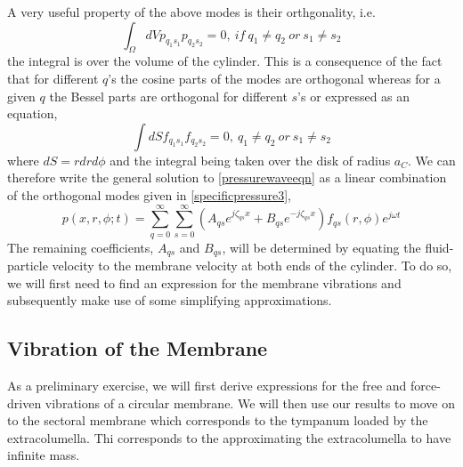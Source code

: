 A very useful property of the above modes is their orthgonality, i.e.
\begin{equation}\label{pressureorthogonality}
 \int_\Omega dVp_{q_1s_1}p_{q_2s_2}=0,\ if\ q_1\neq q_2\ or\ s_1\neq s_2
\end{equation}
the integral is over the volume of the cylinder. This is a consequence of the fact that for different $q$'s
the cosine parts of the modes are orthogonal whereas for a given $q$ the Bessel parts are orthogonal for
different $s$'s or expressed as an equation,
\begin{equation}\label{besselorthogonality}
 \int dS f_{q_1s_1}f_{q_2s_2}=0,\ q_1\neq q_2\ or\ s_1\neq s_2
\end{equation}
where $dS=rdrd\phi$ and the integral being taken over the disk of radius $a_C$.
We can therefore write the general solution to \eqref{pressurewaveeqn} as a linear combination of the orthogonal modes given in \eqref{specificpressure3},
\begin{equation}\label{pressuregeneral1}
 p(x,r,\phi;t)=\displaystyle\sum^\infty_{q=0}\displaystyle\sum^\infty_{s=0}\left(A_{qs}e^{j\zeta_{qs}x}+B_{qs}e^{-j\zeta_{qs}x}\right)f_{qs}(r,\phi)e^{j\omega t}
\end{equation}
The remaining coefficients, $A_{qs}$ and $B_{qs}$, will be determined by equating the fluid-particle velocity to
the membrane velocity at both ends of the cylinder. To do so, we will first need to find an expression
for the membrane vibrations and subsequently make use of some simplifying approximations.

\subsection{Vibration of the Membrane}
As a preliminary exercise, we will first derive expressions for the free and force-driven
vibrations of a circular membrane. We will then use our results to move on to the sectoral membrane 
which corresponds to the tympanum loaded by the extracolumella. Thi corresponds to the approximating
the extracolumella to have infinite mass. 
